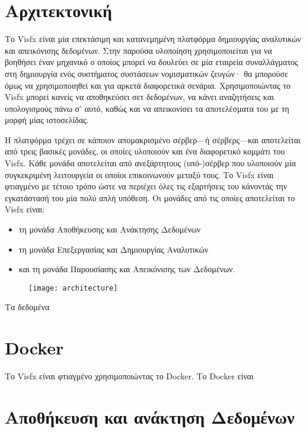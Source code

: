 


\section{Αρχιτεκτονική}

Το Visfx είναι μία επεκτάσιμη και κατανεμημένη πλατφόρμα δημιουργίας αναλυτικών και απεικόνισης δεδομένων. Στην παρούσα υλοποίηση χρησιμοποιείται για να βοηθήσει έναν μηχανικό ο οποίος μπορεί να δουλεύει σε μία εταιρεία συναλλάγματος στη δημιουργία ενός συστήματος συστάσεων νομισματικών ζευγών· θα μπορούσε όμως να χρησιμοποιηθεί και για αρκετά διαφορετικά σενάρια. Χρησιμοποιώντας το Visfx μπορεί κανείς να αποθηκεύσει σετ δεδομένων, να κάνει αναζητήσεις και υπολογισμούς πάνω σ' αυτό, καθώς και να απεικονίσει τα αποτελέσματα του με τη μορφή μίας ιστοσελίδας. 

Η πλατφόρμα τρέχει σε κάποιον απομακρισμένο σέρβερ—ή σέρβερς—και αποτελείται από τρεις βασικές μονάδες, οι οποίες υλοποιούν και ένα διαφορετικό κομμάτι του Visfx. Κάθε μονάδα αποτελείται από ανεξάρτητους (υπό-)σέρβερ που υλοποιούν μία συγκεκριμένη λειτουργεία οι οποίοι επικοινωνούν μεταξύ τους. Το Visfx είναι φτιαγμένο με τέτοιο τρόπο ώστε να περιέχει όλες τις εξαρτήσεις του κάνοντάς την εγκατάστασή του μία πολύ απλή υπόθεση. Οι μονάδες από τις οποίες αποτελείται το Visfx είναι:
\begin{itemize}
	\item τη μονάδα Αποθήκευσης και Ανάκτησης Δεδομένων
	\item τη μονάδα Επεξεργασίας και Δημιουργίας Αναλυτικών
	\item και τη μονάδα Παρουσίασης και Απεικόνισης των Δεδομένων.
\end{itemize}

\begin{figure}[H]
  \centering
  \texttt{[image: architecture]}
  \label{fig:architecture}
\end{figure}

Τα δεδομένα 

\section{Docker}

Το Visfx είναι φτιαγμένο χρησιμοποιώντας το Docker. Το Docker είναι 

\section{Αποθήκευση και ανάκτηση Δεδομένων}
